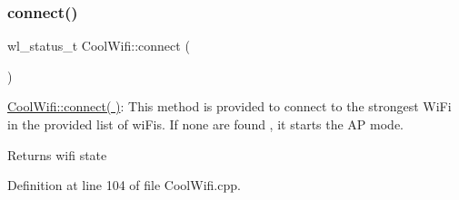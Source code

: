 \subsubsection{\texorpdfstring{connect()}{connect()}}
{\footnotesize\ttfamily wl\+\_\+status\+\_\+t Cool\+Wifi\+::connect (\begin{DoxyParamCaption}{ }\end{DoxyParamCaption})}

\hyperlink{class_cool_wifi_ad060353050f40d032a2dbf9e54a768bf}{Cool\+Wifi\+::connect( )}\+: This method is provided to connect to the strongest Wi\+Fi in the provided list of wi\+Fis. If none are found , it starts the AP mode.

\begin{DoxyReturn}{Returns}
wifi state 
\end{DoxyReturn}


Definition at line 104 of file Cool\+Wifi.\+cpp.



